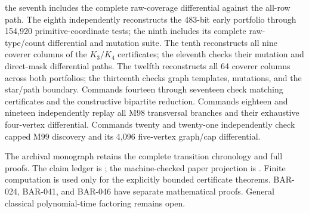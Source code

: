 \documentclass[11pt]{article}
\begin{document}
the seventh includes the complete raw-coverage differential against the
all-row path.  The eighth independently reconstructs the 483-bit early
portfolio through 154,920 primitive-coordinate tests; the ninth includes its
complete raw-type/count differential and mutation suite.  The tenth
reconstructs all nine coverer columns of the \(K_3/K_4\) certificates; the
eleventh checks their mutation and direct-mask differential paths.  The
twelfth reconstructs all 64 coverer columns across both portfolios; the
thirteenth checks graph templates, mutations, and the star/path boundary.
Commands fourteen through seventeen check matching certificates and the
constructive bipartite reduction.  Commands eighteen and nineteen
independently replay all M98 transversal branches and their exhaustive
four-vertex differential.  Commands twenty and twenty-one independently
check capped M99 discovery and its 4,096 five-vertex graph/cap differential.

The archival monograph \archivepaper{} retains the complete transition
chronology and full proofs.  The claim ledger is
; the machine-checked paper projection is
.  Finite computation is used only
for the explicitly bounded certificate theorems.  BAR-024, BAR-041, and
BAR-046 have separate mathematical proofs.  General classical
polynomial-time factoring remains open.

\enlargethispage{3\baselineskip}

\small

\end{document}
